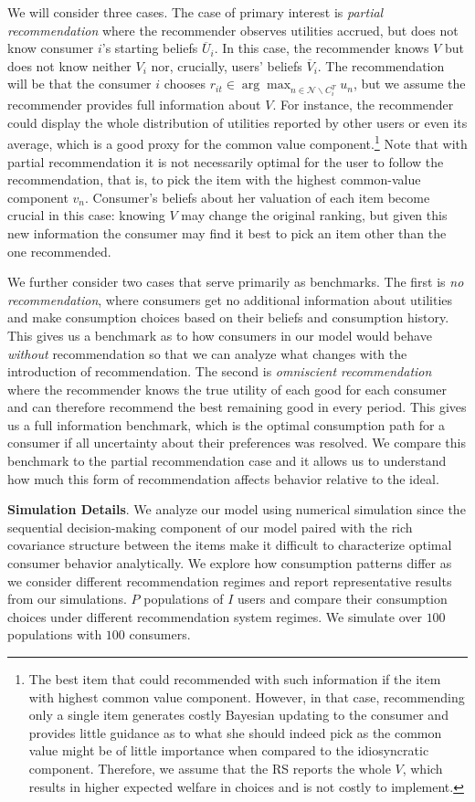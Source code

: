 \documentclass[sigconf]{acmart}
\begin{document}
We will consider three cases. The case of primary interest is \textit{partial recommendation} where the recommender observes utilities accrued, but does not know consumer $i$'s starting beliefs $\overline U_i$. In this case, the recommender knows $V$ but does not know neither $V_i$ nor, crucially, users' beliefs $\overline V_i$. The recommendation will be that the consumer $i$ chooses $r_{it} \in \arg \max_{n \in \mathcal{N} \backslash C_i^T} u_n$, but we assume the recommender provides full information about $V$. For instance, the recommender could display the whole distribution of utilities reported by other users or even its average, which is a good proxy for the common value component.\footnote{
The best item that could recommended with such information if the item with highest common value component. However, in that case, recommending only a single item generates costly Bayesian updating to the consumer and provides little guidance as to what she should indeed pick as the common value might be of little importance when compared to the idiosyncratic component. Therefore, we assume that the RS reports the whole $V$, which results in higher expected welfare in choices and is not costly to implement.
}
Note that with partial recommendation it is not necessarily optimal for the user to follow the recommendation, that is, to pick the item with the highest common-value component $v_n$. Consumer's beliefs about her valuation of each item become crucial in this case: knowing $V$ may change the original ranking, but given this new information the consumer may find it best to pick an item other than the one recommended.

We further consider two cases that serve primarily as benchmarks. The first is \textit{no recommendation}, where consumers get no additional information about utilities and make consumption choices based on their beliefs and consumption history. This gives us a benchmark as to how consumers in our model would behave \textit{without} recommendation so that we can analyze what changes with the introduction of recommendation. The second is \textit{omniscient recommendation} where the recommender knows the true utility of each good for each consumer and can therefore recommend the best remaining good in every period. This gives us a full information benchmark, which is the optimal consumption path for a consumer if all uncertainty about their preferences was resolved. We compare this benchmark to the partial recommendation case and it allows us to understand how much this form of recommendation affects behavior relative to the ideal.
\par
\noindent \textbf{Simulation Details}. We analyze our model using numerical simulation since the sequential decision-making component of our model paired with the rich covariance structure between the items make it difficult to characterize optimal consumer behavior analytically. We explore how consumption patterns differ as we consider different recommendation regimes and report representative results from our simulations. $P$ populations of $I$ users and compare their consumption choices under different recommendation system regimes. We simulate over $100$ populations with $100$ consumers.
\end{document}
